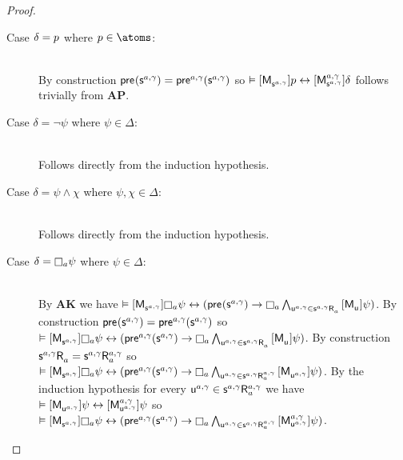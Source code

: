 \begin{proof}
\begin{enumerate}
        \begin{description}
            \item[Case $\delta = \atomP$ where $\atomP \in \atoms$:] \hfill\\
                By construction $\aPrecondition(\aStateS[\agentA, \gamma]) = \aPrecondition[\agentA, \gamma](\aStateS[\agentA, \gamma])$ so $\entails \actionA{\aPModel{\aStateS[\agentA, \gamma]}} \atomP \iff \actionA{\aPModel[\agentA, \gamma]{\aStateS[\agentA, \gamma]}} \delta$ follows trivially from {\bf AP}.
            \item[Case $\delta = \lnot \psi$ where $\psi \in \Delta$:] \hfill\\
                Follows directly from the induction hypothesis.
            \item[Case $\delta = \psi \land \chi$ where $\psi, \chi \in \Delta$:] \hfill\\
                Follows directly from the induction hypothesis.
            \item[Case $\delta = \necessaryA \psi$ where $\psi \in \Delta$:] \hfill\\
                By {\bf AK} we have $\entails \actionA{\aPModel{\aStateS[\agentA, \gamma]}} \necessaryA \psi \iff (\aPrecondition(\aStateS[\agentA, \gamma]) \implies \necessaryA \bigwedge_{\aStateU[\agentA, \gamma] \in \aSuccessorsA{\aStateS[\agentA, \gamma]}} \actionA{\aPModel{\aStateU}} \psi)$.
                By construction $\aPrecondition(\aStateS[\agentA, \gamma]) = \aPrecondition[\agentA, \gamma](\aStateS[\agentA, \gamma])$ so $\entails \actionA{\aPModel{\aStateS[\agentA, \gamma]}} \necessaryA \psi \iff (\aPrecondition[\agentA, \gamma](\aStateS[\agentA, \gamma]) \implies \necessaryA \bigwedge_{\aStateU[\agentA, \gamma] \in \aSuccessorsA{\aStateS[\agentA, \gamma]}} \actionA{\aPModel{\aStateU}} \psi)$.
                By construction $\aSuccessorsA{\aStateS[\agentA, \gamma]} = \aSuccessorsA[\agentA, \gamma]{\aStateS[\agentA, \gamma]}$ so $\entails \actionA{\aPModel{\aStateS[\agentA, \gamma]}} \necessaryA \psi \iff (\aPrecondition[\agentA, \gamma](\aStateS[\agentA, \gamma]) \implies \necessaryA \bigwedge_{\aStateU[\agentA, \gamma] \in \aSuccessorsA[\agentA, \gamma]{\aStateS[\agentA, \gamma]}} \actionA{\aPModel{\aStateU[\agentA, \gamma]}} \psi)$.
                By the induction hypothesis for every $\aStateU[\agentA, \gamma] \in \aSuccessorsA[\agentA, \gamma]{\aStateS[\agentA, \gamma]}$ we have $\entails \actionA{\aPModel{\aStateU[\agentA, \gamma]}} \psi \iff \actionA{\aPModel[\agentA, \gamma]{\aStateU[\agentA, \gamma]}} \psi$ so $\entails \actionA{\aPModel{\aStateS[\agentA, \gamma]}} \necessaryA \psi \iff (\aPrecondition[\agentA, \gamma](\aStateS[\agentA, \gamma]) \implies \necessaryA \bigwedge_{\aStateU[\agentA, \gamma] \in \aSuccessorsA[\agentA, \gamma]{\aStateS[\agentA, \gamma]}} \actionA{\aPModel[\agentA, \gamma]{\aStateU[\agentA, \gamma]}} \psi)$.

\end{description}
\end{enumerate}
\end{proof}
